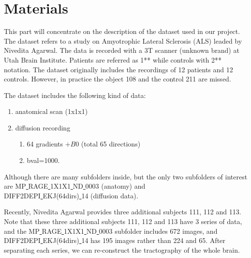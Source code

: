 \section{Materials}
\label{sec:materials}
This part will concentrate on the description of the dataset used in our project. The dataset refers to a study on Amyotrophic Lateral Sclerosis (ALS) leaded by Nivedita Agarwal. The data is recorded with a 3T scanner (unknown brand) at Utah Brain Institute. Patients are referred as 1** while controls with 2** notation. The dataset originally includes the recordings of 12 patients and 12 controls. However, in practice the object 108 and the control 211 are missed. 

The dataset includes the following kind of data:
\begin{enumerate}
\item anatomical scan (1x1x1)
\item diffusion recording 
	\begin{enumerate}
	\item 64 gradients $+ B0$ (total 65 directions)
	\item bval=1000.
	\end{enumerate}	 
\end{enumerate}

Although there are many subfolders inside, but the only two subfolders of interest are MP\underline{ }RAGE\underline{ }1X1X1\underline{ }ND\underline{ }0003 (anatomy) and 
\\DIFF2DEPI\underline{ }EKJ(64dirs)\underline{ }14 (diffusion data). 

Recently, Nivedita Agarwal provides three additional subjects 111, 112 and 113. Note that these three additional subjects 111, 112 and 113 have 3 series of data, and the MP\underline{ }RAGE\underline{ }1X1X1\underline{ }ND\underline{ }0003 subfolder includes 672 images, and DIFF2DEPI\underline{ }EKJ(64dirs)\underline{ }14 has 195 images rather than 224 and 65. After separating each series, we can re-construct the tractography of the whole brain.
 
